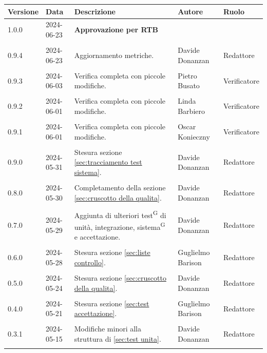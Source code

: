 \documentclass[8pt]{article}
\newcommand{\glossterm}[1]{#1\textsuperscript{G}} %
\begin{document}
\begin{table}[ht!]	
	\centering
	\begin{tabular}{p{1.2cm} p{2cm} p{6cm} p{3cm} p{2cm}}
		\toprule
		\textbf{Versione}& \textbf{Data} & \textbf{Descrizione} & \textbf{Autore} & \textbf{Ruolo} \\
		\midrule
  		1.0.0 & 2024-06-23 & \textbf{Approvazione per RTB} & & \\\\
        0.9.4 & 2024-06-23 & Aggiornamento metriche. & Davide Donanzan & Redattore \\\\
        0.9.3 & 2024-06-03 & Verifica completa con piccole modifiche. & Pietro Busato & Verificatore \\\\
        0.9.2 & 2024-06-01 & Verifica completa con piccole modifiche. & Linda Barbiero & Verificatore \\\\
        0.9.1 & 2024-06-01 & Verifica completa con piccole modifiche. & Oscar Konieczny & Verificatore \\\\
        0.9.0 & 2024-05-31 & Stesura sezione \ref{sec:tracciamento test sistema}. & Davide Donanzan & Redattore \\\\
        0.8.0 & 2024-05-30 & Completamento della sezione \ref{sec:cruscotto della qualita}. & Davide Donanzan & Redattore \\\\
        0.7.0 & 2024-05-29 & Aggiunta di ulteriori \glossterm{test} di unità, integrazione, \glossterm{sistema} e accettazione. & Davide Donanzan & Redattore \\\\
        0.6.0 & 2024-05-28 & Stesura sezione \ref{sec:liste controllo}. & Guglielmo Barison & Redattore \\\\
        0.5.0 & 2024-05-24 & Stesura sezione \ref{sec:cruscotto della qualita}. & Davide Donanzan & Redattore \\\\
        0.4.0 & 2024-05-21 & Stesura sezione \ref{sec:test accettazione}. & Guglielmo Barison & Redattore \\\\
        0.3.1 & 2024-05-15 & Modifiche minori alla struttura di \ref{sec:test unita}. & Davide Donanzan & Redattore \\\\

\end{tabular}
\end{table}
\end{document}
